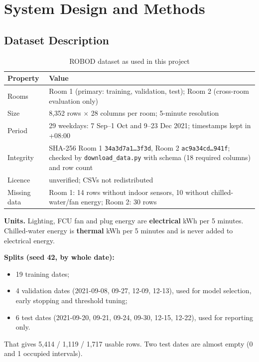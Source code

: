 \documentclass[12pt,a4paper,oneside]{report}
\begin{document}
\chapter{System Design and Methods}\label{ch:design}

\section{Dataset Description}
\begin{table}[H]
\centering
\caption{ROBOD dataset as used in this project}
\label{tab:data}
\begin{tabularx}{\textwidth}{@{}L{3.0cm}Y@{}}
\toprule
\textbf{Property} & \textbf{Value}\\
\midrule
Rooms & Room 1 (primary: training, validation, test); Room 2 (cross-room evaluation only)\\
Size & 8,352 rows $\times$ 28 columns per room; 5-minute resolution\\
Period & 29 weekdays: 7 Sep--1 Oct and 9--23 Dec 2021; timestamps kept in +08:00\\
Integrity & SHA-256 Room 1 \texttt{34a3d7a1\ldots3f3d}, Room 2 \texttt{ac9a34cd\ldots941f}; checked by \texttt{download\_data.py} with schema (18 required columns) and row count\\
Licence & unverified; CSVs not redistributed\\
Missing data & Room 1: 14 rows without indoor sensors, 10 without chilled-water/fan energy; Room 2: 30 rows\\
\bottomrule
\end{tabularx}
\end{table}

\textbf{Units.} Lighting, FCU fan and plug energy are \textbf{electrical} kWh per 5 minutes. Chilled-water energy is
\textbf{thermal} kWh per 5 minutes and is never added to electrical energy.

\textbf{Splits (seed 42, by whole date):}
\begin{itemize}
\item 19 training dates;
\item 4 validation dates (2021-09-08, 09-27, 12-09, 12-13), used for model selection, early stopping and threshold
  tuning;
\item 6 test dates (2021-09-20, 09-21, 09-24, 09-30, 12-15, 12-22), used for reporting only.
\end{itemize}
That gives 5,414 / 1,119 / 1,717 usable rows. Two test dates are almost empty (0 and 1 occupied intervals).
\end{document}
